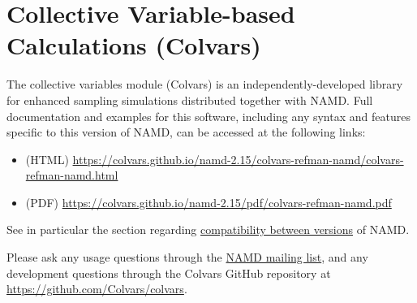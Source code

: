 \section{Collective Variable-based Calculations (Colvars)}
\label{section:colvars}

The collective variables module (Colvars) is an independently-developed library for enhanced sampling simulations distributed together with NAMD.
Full documentation and examples for this software, including any syntax and features specific to this version of NAMD, can be accessed at the following links:
\begin{itemize}
\item (HTML) \url{https://colvars.github.io/namd-2.15/colvars-refman-namd/colvars-refman-namd.html}
\item (PDF) \url{https://colvars.github.io/namd-2.15/pdf/colvars-refman-namd.pdf}
\end{itemize}
\noindent{}See in particular the section regarding \href{https://colvars.github.io/namd-2.15/colvars-refman-namd/colvars-refman-namd.html#sec:colvars_config_changes}{compatibility between versions} of NAMD.
 
Please ask any usage questions through the \href{https://www.ks.uiuc.edu/Research/namd/mailing_list/}{NAMD mailing list}, and any development questions through the Colvars GitHub repository at \url{https://github.com/Colvars/colvars}.
